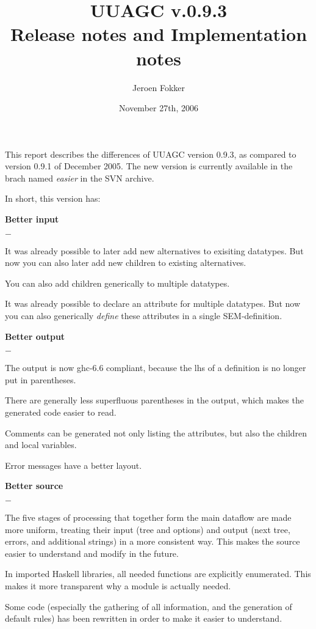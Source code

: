 \documentclass[twoside]{article}
\newenvironment{subitize}{\begin{list}{$-$}{\parsep=0pt\parskip=0pt\topsep=0pt\itemsep=0pt}}{\end{list}}
\begin{document}


\title{UUAGC v.0.9.3\\Release notes and Implementation notes}
\author{Jeroen Fokker}
\date{November 27th, 2006}
\maketitle

This report describes the differences of UUAGC version 0.9.3,
as compared to version 0.9.1 of December 2005.
The new version is currently available in the brach named {\em easier} in the SVN archive.

In short, this version has:
\begin{itemize}
\item {\bf Better input}
	\begin{subitize}
	\item It was already possible to later add new alternatives to exisiting datatypes.
	      But now you can also later add new children to existing alternatives.
	\item You can also add children generically to multiple datatypes.
	\item It was already possible to declare an attribute for multiple datatypes.
	      But now you can also generically {\em define} these attributes in a single SEM-definition.
	\end{subitize}	      
\item {\bf Better output}
	\begin{subitize}
	\item The output is now ghc-6.6 compliant, because the lhs of a definition is no longer put in parentheses.
	\item There are generally less superfluous parentheses in the output,
	      which makes the generated code easier to read.
	\item Comments can be generated not only listing the attributes, but also the children and local variables.
	\item Error messages have a better layout.
	\end{subitize}
\item {\bf Better source}
	\begin{subitize}
	\item The five stages of processing that together form the main dataflow are made more uniform,
	      treating their input (tree and options) and output (next tree, errors, and additional strings)
	      in a more consistent way. This makes the source easier to understand and modify in the future.
	\item In imported Haskell libraries, all needed functions are explicitly enumerated.
	      This makes it more transparent why a module is actually needed.
	\item Some code (especially the gathering of all information, and the generation of default rules)
	      has been rewritten in order to make it easier to understand.
    \end{subitize}
\end{itemize}
\end{document}
